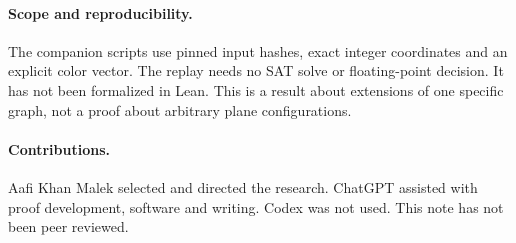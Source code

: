 \documentclass[11pt,letterpaper]{article}
\begin{document}
\paragraph{Scope and reproducibility.}
The companion scripts use pinned input hashes, exact integer
coordinates and an explicit color vector. The replay needs
no SAT solve or floating-point decision. It has not been
formalized in Lean. This is a result about extensions of one
specific graph, not a proof about arbitrary plane configurations.

\paragraph{Contributions.}
Aafi Khan Malek selected and directed the research. ChatGPT
assisted with proof development, software and writing. Codex was
not used. This note has not been peer reviewed.
\end{document}
